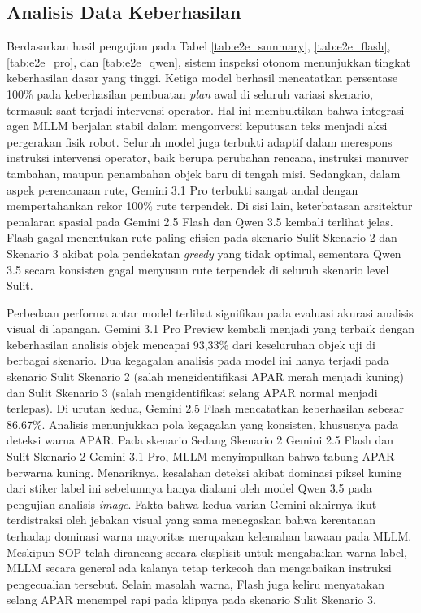 \subsection{Analisis Data Keberhasilan}
Berdasarkan hasil pengujian pada Tabel \ref{tab:e2e_summary}, \ref{tab:e2e_flash}, \ref{tab:e2e_pro}, dan \ref{tab:e2e_qwen}, sistem inspeksi otonom menunjukkan tingkat keberhasilan dasar yang tinggi. Ketiga model berhasil mencatatkan persentase 100\% pada keberhasilan pembuatan \textit{plan} awal di seluruh variasi skenario, termasuk saat terjadi intervensi operator. Hal ini membuktikan bahwa integrasi agen MLLM berjalan stabil dalam mengonversi keputusan teks menjadi aksi pergerakan fisik robot. Seluruh model juga terbukti adaptif dalam merespons instruksi intervensi operator, baik berupa perubahan rencana, instruksi manuver tambahan, maupun penambahan objek baru di tengah misi. Sedangkan, dalam aspek perencanaan rute, Gemini 3.1 Pro terbukti sangat andal dengan mempertahankan rekor 100\% rute terpendek. Di sisi lain, keterbatasan arsitektur penalaran spasial pada Gemini 2.5 Flash dan Qwen 3.5 kembali terlihat jelas. Flash gagal menentukan rute paling efisien pada skenario Sulit Skenario 2 dan Skenario 3 akibat pola pendekatan \textit{greedy} yang tidak optimal, sementara Qwen 3.5 secara konsisten gagal menyusun rute terpendek di seluruh skenario level Sulit.

Perbedaan performa antar model terlihat signifikan pada evaluasi akurasi analisis visual di lapangan. Gemini 3.1 Pro Preview kembali menjadi yang terbaik dengan keberhasilan analisis objek mencapai 93,33\% dari keseluruhan objek uji di berbagai skenario. Dua kegagalan analisis pada model ini hanya terjadi pada skenario Sulit Skenario 2 (salah mengidentifikasi APAR merah menjadi kuning) dan Sulit Skenario 3 (salah mengidentifikasi selang APAR normal menjadi terlepas). Di urutan kedua, Gemini 2.5 Flash mencatatkan keberhasilan sebesar 86,67\%. Analisis menunjukkan pola kegagalan yang konsisten, khususnya pada deteksi warna APAR. Pada skenario Sedang Skenario 2 Gemini 2.5 Flash dan Sulit Skenario 2 Gemini 3.1 Pro, MLLM menyimpulkan bahwa tabung APAR berwarna kuning. Menariknya, kesalahan deteksi akibat dominasi piksel kuning dari stiker label ini sebelumnya hanya dialami oleh model Qwen 3.5 pada pengujian analisis \textit{image}. Fakta bahwa kedua varian Gemini akhirnya ikut terdistraksi oleh jebakan visual yang sama menegaskan bahwa kerentanan terhadap dominasi warna mayoritas merupakan kelemahan bawaan  pada MLLM. Meskipun SOP telah dirancang secara eksplisit untuk mengabaikan warna label, MLLM secara general ada kalanya tetap terkecoh dan mengabaikan instruksi pengecualian tersebut. Selain masalah warna, Flash juga keliru menyatakan selang APAR menempel rapi pada klipnya pada skenario Sulit Skenario 3.

